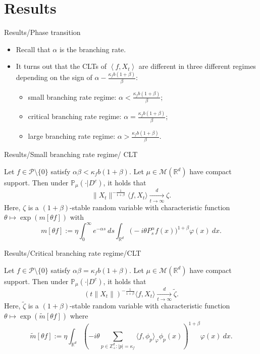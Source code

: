 \documentclass[xcolor=dvipsnames]{beamer}
\begin{document}
\section{Results}
\begin{frame}{Results/Phase transition}
\begin{itemize}
\item
  Recall that $\alpha$ is the branching rate.
\item
	It turns out that the CLTs of $\left\langle f,X_t \right\rangle$ are different in three different regimes
    depending on the sign of $\alpha-\frac{\kappa_f b (1+\beta)}{\beta}$:
\begin{itemize}
\item
  small branching rate regime: $\alpha < \frac{\kappa_f b (1+\beta)}{\beta}$;
\item
  critical branching rate regime: $\alpha = \frac{\kappa_f b (1+\beta)}{\beta}$;
\item
  large branching rate regime: $\alpha > \frac{\kappa_f b (1+\beta)}{\beta}$.
\end{itemize}
\end{itemize}
\end{frame}
\begin{frame}{Results/Small branching rate regime/ CLT}
\begin{theorem}
    Let $f\in \mathcal{P}\setminus\{0\}$ satisfy $\alpha\beta<\kappa_f b(1+\beta)$.
    Let $\mu\in \mathcal M(\mathbb R^d)$ have compact support. Then under $\mathbb{P}_{\mu}(\cdot|D^c)$, it holds that
\[
    \|X_t\|^{-\frac{1}{1+\beta}} \langle f,X_t\rangle\xrightarrow[t\rightarrow \infty]{d} \zeta.
\]
    Here, $\zeta$ is a $(1+\beta)$-stable random variable with characteristic function $\theta \mapsto \exp( m[\theta f])$ with 
    \begin{equation}
      m[\theta f]
      :=\eta \int_0^{\infty} e^{-\alpha s} ~ds\int_{\mathbb R^d} \big(-i \theta P_s^\alpha f(x)\big)^{1+\beta} \varphi(x)~dx.
    \end{equation}
\end{theorem}
\end{frame}

\begin{frame}{Results/Critical branching rate regime/CLT}
\begin{theorem}
\label{thm: critical clt}
    Let $f\in \mathcal{P}\setminus\{0\}$ satisfy $\alpha\beta=\kappa_f b(1+\beta)$.
    Let $\mu\in \mathcal M(\mathbb R^d)$ have compact support. Then under $\mathbb{P}_{\mu}(\cdot|D^c)$, it holds that
\[
    (t\|X_t\|)^{-\frac{1}{1+\beta}} \langle f,X_t\rangle
        \xrightarrow[t\to \infty]{d} \widetilde{\zeta}.
\]
    Here, $\widetilde{\zeta}$ is a $(1+\beta)$-stable random variable with
    characteristic function $\theta \mapsto \exp( \widetilde m[\theta f])$ where
    \[
      \widetilde{m}[\theta f]
      := \eta\int_{\mathbb R^d} \left(-i \theta \sum_{p\in \mathbb Z_+^d:|p|=\kappa_f}\langle f,\phi_p\rangle_\varphi \phi_p(x)\right)^{1+\beta} \varphi(x)~dx.
    \]
\end{theorem}
\end{frame}
\end{document}
